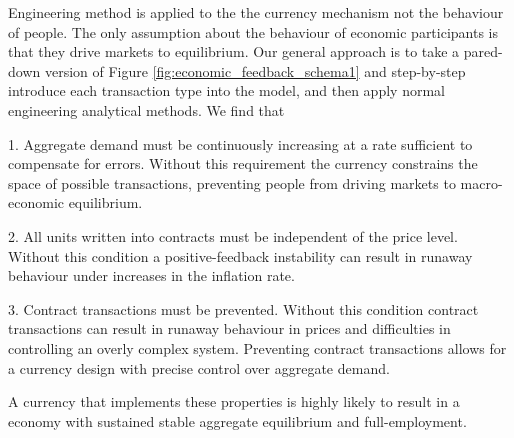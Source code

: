 Engineering method is applied to the the currency mechanism not the behaviour of people. The only
assumption about the behaviour of economic participants is that they drive markets to equilibrium.
Our general approach is to take a pared-down version of Figure \ref{fig:economic_feedback_schema1}
and step-by-step introduce each transaction type into the model, and then apply normal engineering
analytical methods. We find that

1. Aggregate demand must be continuously increasing at a rate sufficient to compensate for errors.
Without this requirement the currency constrains the space of possible transactions, preventing
people from driving markets to macro-economic equilibrium.

2. All units written into contracts must be independent of the price level. Without this condition a
positive-feedback instability can result in runaway behaviour under increases in the inflation rate.

3. Contract transactions must be prevented. Without this condition contract transactions can result
in runaway behaviour in prices and difficulties in controlling an overly complex system. Preventing
contract transactions allows for a currency design with precise control over aggregate demand.

A currency that implements these properties is highly likely to result in a economy with sustained
stable aggregate equilibrium and full-employment.

